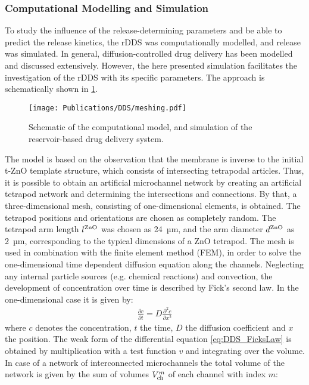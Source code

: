 \subsubsection{Computational Modelling and Simulation}
To study the influence of the release-determining parameters and be able to predict the release kinetics, the rDDS was computationally modelled, and release was simulated. In general, diffusion-controlled drug delivery has been modelled and discussed extensively\supercite{siepmann2012modeling,peppas2014mathematical}. However, the here presented simulation facilitates the investigation of the rDDS with its specific parameters. The approach is schematically shown in \cref{fig:meshing}. 
\begin{figure}[h!]
  \centering
  \texttt{[image: Publications/DDS/meshing.pdf]}
  \caption{Schematic of the computational model, and simulation of the reservoir-based drug delivery system.}
  \label{fig:meshing}
\end{figure}
The model is based on the observation that the membrane is inverse to the initial t-ZnO template structure, which consists of intersecting tetrapodal articles. Thus, it is possible to obtain an artificial microchannel network by creating an artificial tetrapod network and determining the intersections and connections. By that, a three-dimensional mesh, consisting of one-dimensional elements, is obtained. The tetrapod positions and orientations are chosen as completely random. The tetrapod arm length $l^{\rm ZnO}$ was chosen as 24~µm, and the arm diameter $d^{\rm ZnO}$ as 2~µm, corresponding to the typical dimensions of a ZnO tetrapod. The mesh is used in combination with the finite element method (FEM), in order to solve the one-dimensional time dependent diffusion equation along the channels. Neglecting any internal particle sources (e.g. chemical reactions) and convection, the development of concentration over time is described by Fick’s second law. In the one-dimensional case it is given by:
\begin{align}
  \frac{\partial c}{\partial t} = D \frac{\partial^2 c}{\partial x^2}
  \label{eq:DDS_FicksLaw}
\end{align}
where $c$ denotes the concentration, $t$ the time, $D$ the diffusion coefficient and $x$ the position. The weak form of the differential equation \ref{eq:DDS_FicksLaw} is obtained by multiplication with a test function $v$ and integrating over the volume. In case of a network of interconnected microchannels the total volume of the network is given by the sum of volumes $V^{m}_{\rm ch}$ of each channel with index $m$:
